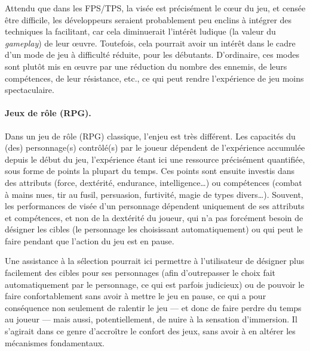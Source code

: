 	Attendu que dans les FPS/TPS, la visée est précisément le cœur du jeu, et censée être difficile, les développeurs seraient probablement peu enclins à intégrer des techniques la facilitant, car cela diminuerait l'intérêt ludique (la valeur du \emph{gameplay}) de leur œuvre. Toutefois, cela pourrait avoir un intérêt dans le cadre d'un mode de jeu à difficulté réduite, pour les débutants. D'ordinaire, ces modes sont plutôt mis en œuvre par une réduction du nombre des ennemis, de leurs compétences, de leur résistance, etc., ce qui peut rendre l'expérience de jeu moins spectaculaire.
	
	\paragraph{Jeux de rôle (RPG).}
	Dans un jeu de rôle (RPG) classique, l'enjeu est très différent. Les capacités du (des) personnage(s) contrôlé(s) par le joueur dépendent de l'expérience accumulée depuis le début du jeu, l'expérience étant ici une ressource précisément quantifiée, sous forme de points la plupart du temps. Ces points sont ensuite investis dans des attributs (force, dextérité, endurance, intelligence\ldots{}) ou compétences (combat à mains nues, tir au fusil, persuasion, furtivité, magie de types divers\ldots{}). Souvent, les performances de visée d'un personnage dépendent uniquement de ses attributs et compétences, et non de la dextérité du joueur, qui n'a pas forcément besoin de désigner les cibles (le personnage les choisissant automatiquement) ou qui peut le faire pendant que l'action du jeu est en pause.
	
	Une assistance à la sélection pourrait ici permettre à l'utilisateur de désigner plus facilement des cibles pour ses personnages (afin d'outrepasser le choix fait automatiquement par le personnage, ce qui est parfois judicieux) ou de pouvoir le faire confortablement sans avoir à mettre le jeu en pause, ce qui a pour conséquence non seulement de ralentir le jeu --- et donc de faire perdre du temps au joueur --- mais aussi, potentiellement, de nuire à la sensation d'immersion. Il s'agirait dans ce genre d'accroître le confort des jeux, sans avoir à en altérer les mécanismes fondamentaux.
	
